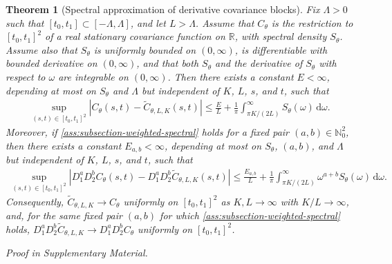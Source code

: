 \documentclass[11pt,a4paper]{article}
\newtheorem{theorem}{Theorem}
\theoremstyle{definition}
\theoremstyle{remark}
\newenvironment{maintheorem}[1][]{\begin{theorem}[#1]}{\par\noindent\emph{Proof in Supplementary Material.}\end{theorem}}
\begin{document}
\begin{maintheorem}[Spectral approximation of derivative covariance blocks]\label{prop:spectral-approximation-bounds}
Fix \(\Lambda>0\) such that $[t_0,t_1]\subset[-\Lambda,\Lambda]$, and let \(L>\Lambda\). Assume that \(C_\theta\) is the restriction to \([t_0,t_1]^2\) of a real stationary covariance function on \(\mathbb R\), with spectral density \(S_\theta\). Assume also that \(S_\theta\) is uniformly bounded on \((0,\infty)\), is differentiable with bounded derivative on \((0,\infty)\), and that both \(S_\theta\) and the derivative of \(S_\theta\) with respect to \(\omega\) are integrable on \((0,\infty)\). Then there exists a constant \(E<\infty\), depending at most on \(S_\theta\) and \(\Lambda\) but independent of \(K\), \(L\), \(s\), and \(t\), such that
\begin{align*}
\sup_{(s,t)\in [t_0,t_1]^2}
\left|
C_\theta(s,t)-\widetilde C_{\theta,L,K}(s,t)
\right|
\le
\frac{E}{L}
+
\frac{1}{\pi}
\int_{\pi K/(2L)}^\infty S_\theta(\omega)\,\mathrm d\omega.
\end{align*}
Moreover, if \cref{ass:subsection-weighted-spectral} holds for a fixed pair \((a,b)\in \mathbb N_0^2\), then there exists a constant \(E_{a,b}<\infty\), depending at most on \(S_\theta\), \((a,b)\), and \(\Lambda\) but independent of \(K\), \(L\), \(s\), and \(t\), such that
\begin{align*}
\sup_{(s,t)\in [t_0,t_1]^2}
\left|
D_1^a D_2^b C_\theta(s,t)
-
D_1^a D_2^b \widetilde C_{\theta,L,K}(s,t)
\right|
\le
\frac{E_{a,b}}{L}
+
\frac{1}{\pi}
\int_{\pi K/(2L)}^\infty \omega^{a+b}S_\theta(\omega)\,\mathrm d\omega.
\end{align*}
Consequently, $\widetilde C_{\theta,L,K}\to C_\theta$ uniformly on $[t_0,t_1]^2$ as \(K,L\to\infty\) with \(K/L\to\infty\), and, for the same fixed pair \((a,b)\) for which \cref{ass:subsection-weighted-spectral} holds, $D_1^a D_2^b \widetilde C_{\theta,L,K} \to D_1^a D_2^b C_\theta$ uniformly on $[t_0,t_1]^2$.
\end{maintheorem}
\end{document}
